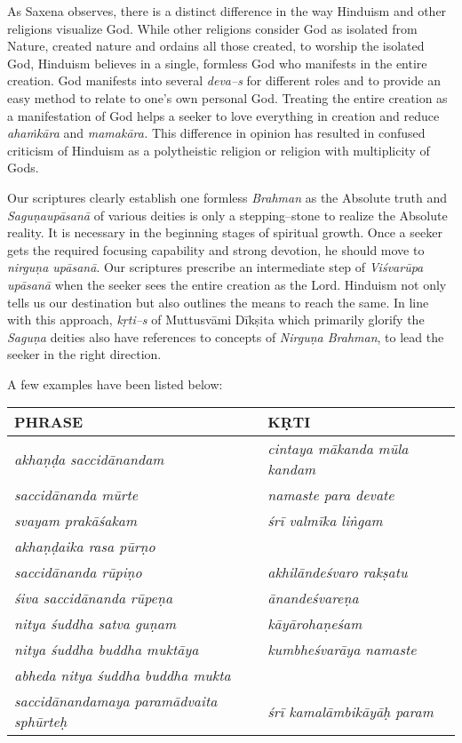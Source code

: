 As Saxena observes, there is a distinct difference in the way Hinduism and other religions visualize God. While other religions consider God as isolated from Nature, created nature and ordains all those created, to worship the isolated God, Hinduism believes in a single, formless God who manifests in the entire creation. God manifests into several \textit{deva–s} for different roles and to provide an easy method to relate to one’s own personal God. Treating the entire creation as a manifestation of God helps a seeker to love everything in creation and reduce \textit{ahaṁkāra} and \textit{mamakāra.} This difference in opinion has resulted in confused criticism of Hinduism as a polytheistic religion or religion with multiplicity of Gods.

Our scriptures clearly establish one formless \textit{Brahman} as the Absolute truth and \textit{Saguṇaupāsanā} of various deities is only a stepping–stone to realize the Absolute reality. It is necessary in the beginning stages of spiritual growth. Once a seeker gets the required focusing capability and strong devotion, he should move to \textit{nirguṇa upāsanā}. Our scriptures prescribe an intermediate step of \textit{Viśvarūpa upāsanā} when the seeker sees the entire creation as the Lord. Hinduism not only tells us our destination but also outlines the means to reach the same. In line with this approach, \textit{kṛti–s} of Muttusvāmi Dīkṣita which primarily glorify the \textit{Saguṇa} deities also have references to concepts of \textit{Nirguṇa Brahman}, to lead the seeker in the right direction.

A few examples have been listed below:

\begin{tabular}{|l|l|}
\hline
\textbf{PHRASE} & \textbf{KṚTI} \\
\hline
\textit{akhaṇḍa saccidānandam} & \textit{cintaya mākanda mūla kandam} \\
\hline
\textit{saccidānanda mūrte} & \textit{namaste para devate} \\
\hline
\textit{svayam prakāśakam} & \textit{śrī valmīka liṅgam} \\
\hline
\textit{akhaṇḍaika rasa pūrṇo}\\\textit{saccidānanda rūpiṇo} & \textit{akhilāndeśvaro rakṣatu} \\
\hline
\textit{śiva saccidānanda rūpeṇa} & \textit{ānandeśvareṇa} \\
\hline
\textit{nitya śuddha satva guṇam} & \textit{kāyārohaṇeśam} \\
\hline
\textit{nitya śuddha buddha muktāya} & \textit{kumbheśvarāya namaste} \\
\hline
\textit{abheda nitya śuddha buddha mukta}\\\textit{saccidānandamaya paramādvaita sphūrteḥ} & \textit{śrī kamalāmbikāyāḥ param} \\
\hline
\end{tabular}

